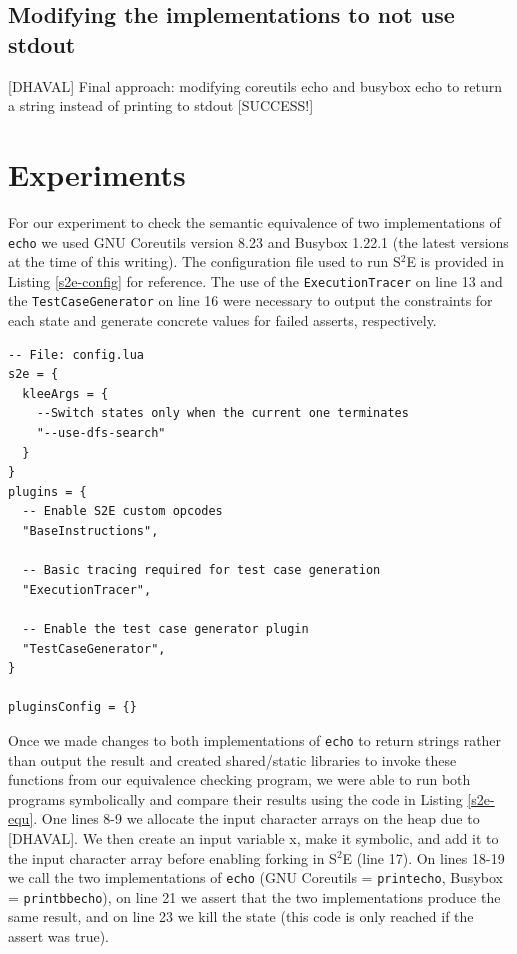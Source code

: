 \documentclass[conference]{IEEEtran}
\begin{document}
\subsection{Modifying the implementations to not use stdout}
[DHAVAL] Final approach: modifying coreutils echo and busybox echo to return a string instead of printing to stdout [SUCCESS!]


\section{Experiments}

For our experiment to check the semantic equivalence of two implementations of {\tt echo} we used GNU Coreutils version 8.23 and Busybox 1.22.1 (the latest versions at the time of this writing). The configuration file used to run S$^2$E is provided in Listing \ref{s2e-config} for reference. The use of the {\tt ExecutionTracer} on line 13 and the {\tt TestCaseGenerator} on line 16 were necessary to output the constraints for each state and generate concrete values for failed asserts, respectively. \\

\begin{lstlisting}[style=Lua, label=s2e-config, abovecaptionskip=2ex, captionpos=b, caption={S$^2$E configuration file used for experiment}]
-- File: config.lua
s2e = {
  kleeArgs = {
    --Switch states only when the current one terminates
    "--use-dfs-search"
  }
}
plugins = {
  -- Enable S2E custom opcodes
  "BaseInstructions",

  -- Basic tracing required for test case generation
  "ExecutionTracer",

  -- Enable the test case generator plugin
  "TestCaseGenerator",
}

pluginsConfig = {}
\end{lstlisting}

Once we made changes to both implementations of {\tt echo} to return strings rather than output the result and created shared/static libraries to invoke these functions from our equivalence checking program, we were able to run both programs symbolically and compare their results using the code in Listing \ref{s2e-equ}. One lines 8-9 we allocate the input character arrays on the heap due to [DHAVAL]. We then create an input variable x, make it symbolic, and add it to the input character array before enabling forking in S$^2$E (line 17). On lines 18-19 we call the two implementations of {\tt echo} (GNU Coreutils = {\tt printecho}, Busybox = {\tt printbbecho}), on line 21 we assert that the two implementations produce the same result, and on line 23 we kill the state (this code is only reached if the assert was true). \\
\end{document}
